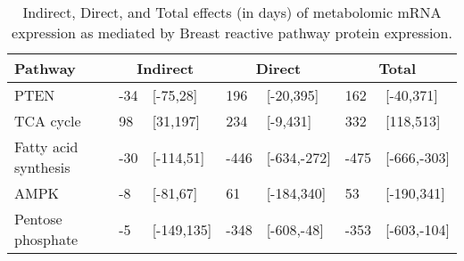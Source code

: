 \begin{table}[ht]
\centering
\begin{tabular}{lllllll}
  \hline
  Pathway & \multicolumn{2}{c}{Indirect} & \multicolumn{2}{c}{Direct}  & \multicolumn{2}{c}{Total} \\
 \hline
PTEN & -34 & [-75,28] & 196 & [-20,395] & 162 & [-40,371] \\ 
  TCA cycle & 98 & [31,197] & 234 & [-9,431] & 332 & [118,513] \\ 
  Fatty acid synthesis & -30 & [-114,51] & -446 & [-634,-272] & -475 & [-666,-303] \\ 
  AMPK & -8 & [-81,67] & 61 & [-184,340] & 53 & [-190,341] \\ 
  Pentose phosphate & -5 & [-149,135] & -348 & [-608,-48] & -353 & [-603,-104] \\ 
   \hline
\end{tabular}
\caption{Indirect, Direct, and Total effects (in days) of metabolomic mRNA expression as mediated by Breast reactive pathway protein expression.} 
\end{table}
